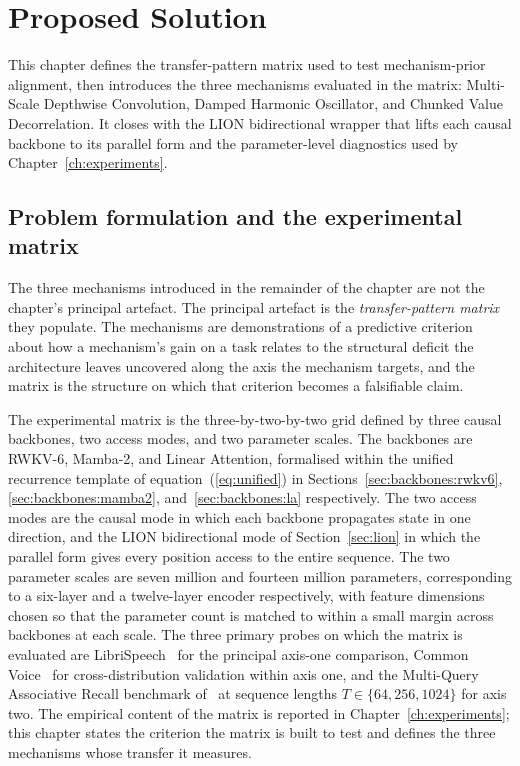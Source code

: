 \chapter{Proposed Solution}\label{ch:proposed}

This chapter defines the transfer-pattern matrix used to test
mechanism-prior alignment, then introduces the three mechanisms
evaluated in the matrix: Multi-Scale Depthwise Convolution, Damped
Harmonic Oscillator, and Chunked Value Decorrelation. It closes
with the LION bidirectional wrapper that lifts each causal
backbone to its parallel form and the parameter-level diagnostics
used by Chapter~\ref{ch:experiments}.

\section{Problem formulation and the experimental matrix}\label{sec:proposed:matrix}

The three mechanisms introduced in the remainder of the chapter are
not the chapter's principal artefact. The principal artefact is the
\textit{transfer-pattern matrix} they populate. The mechanisms are
demonstrations of a predictive criterion about how a mechanism's
gain on a task relates to the structural deficit the architecture
leaves uncovered along the axis the mechanism targets, and the
matrix is the structure on which that criterion becomes a
falsifiable claim.

The experimental matrix is the three-by-two-by-two grid defined by
three causal backbones, two access modes, and two parameter scales.
The backbones are RWKV-6, Mamba-2, and Linear Attention, formalised
within the unified recurrence template of equation~(\ref{eq:unified})
in Sections~\ref{sec:backbones:rwkv6}, \ref{sec:backbones:mamba2},
and~\ref{sec:backbones:la} respectively. The two access modes are the
causal mode in which each backbone propagates state in one direction,
and the LION bidirectional mode of Section~\ref{sec:lion} in which
the parallel form gives every position access to the entire sequence.
The two parameter scales are seven million and fourteen million
parameters, corresponding to a six-layer and a twelve-layer encoder
respectively, with feature dimensions chosen so that the parameter
count is matched to within a small margin across backbones at each
scale. The three primary probes on which the matrix is evaluated are
LibriSpeech~\cite{panayotov2015librispeech} for the principal axis-one
comparison, Common Voice~\cite{ardila2019commonvoice} for
cross-distribution validation within axis one, and the Multi-Query
Associative Recall benchmark of~\citet{arora2023zoology} at sequence
lengths $T \in \{64, 256, 1024\}$ for axis two. The empirical content
of the matrix is reported in Chapter~\ref{ch:experiments}; this
chapter states the criterion the matrix is built to test and defines the
three mechanisms whose transfer it measures.


